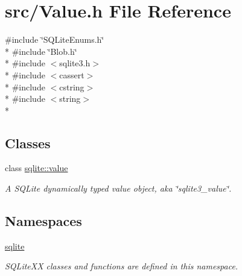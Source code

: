 \hypertarget{a00037}{\section{src/\-Value.h File Reference}
\label{a00037}
}
{\ttfamily \#include \char`\"{}S\-Q\-Lite\-Enums.\-h\char`\"{}}\\*
{\ttfamily \#include \char`\"{}Blob.\-h\char`\"{}}\\*
{\ttfamily \#include $<$sqlite3.\-h$>$}\\*
{\ttfamily \#include $<$cassert$>$}\\*
{\ttfamily \#include $<$cstring$>$}\\*
{\ttfamily \#include $<$string$>$}\\*
\subsection*{Classes}
\begin{DoxyCompactItemize}
\item 
class \hyperlink{a00015}{sqlite\-::value}
\begin{DoxyCompactList}\small\item\em A S\-Q\-Lite dynamically typed value object, aka \char`\"{}sqlite3\-\_\-value\char`\"{}. \end{DoxyCompactList}\end{DoxyCompactItemize}
\subsection*{Namespaces}
\begin{DoxyCompactItemize}
\item 
\hyperlink{a00038}{sqlite}
\begin{DoxyCompactList}\small\item\em S\-Q\-Lite\-X\-X classes and functions are defined in this namespace. \end{DoxyCompactList}\end{DoxyCompactItemize}
